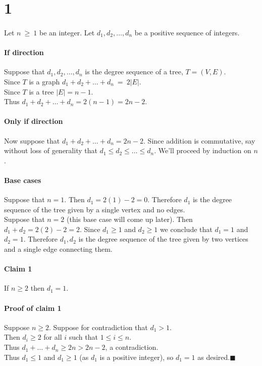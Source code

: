 \documentclass[letterpaper,12pt,oneside,onecolumn]{report}
\begin{document}
\section*{1}
\paragraph{}
Let $n\ \geq\ 1$ be an integer. Let $d_1,d_2,\ldots,d_n$ be a positive sequence of integers.
\paragraph{If direction}
Suppose that $d_1,d_2,\ldots,d_n$ is the degree sequence of a tree, $T = (V,E)$.\\
Since $T$ is a graph $d_1 + d_2 + \ldots + d_n\ =\ 2|E|$.\\
Since $T$ is a tree $|E| = n - 1$.\\
Thus $d_1 + d_2 + \ldots + d_n = 2(n-1) = 2n-2$.
\paragraph{Only if direction}
Now suppose that $d_1 + d_2 + \ldots + d_n = 2n-2$. Since addition is commutative, say without loss of generality that $d_1 \leq d_2 \leq \ldots \leq d_n$.
We'll proceed by induction on $n$.
\paragraph{Base cases}
Suppose that $n=1$. Then $d_1 = 2(1) - 2 = 0$. Therefore $d_1$ is the degree sequence of the tree given by a single vertex and no edges.\\
Suppose that $n=2$ (this base case will come up later). Then $d_1 + d_2 = 2(2) -2 = 2$. Since $d_1 \geq 1$ and $d_2 \geq 1$ we conclude that $d_1 = 1$ and $d_2 = 1$. Therefore $d_1, d_2$ is the degree sequence of the tree given by two vertices and a single edge connecting them.\\
\paragraph{Claim 1}
If $n \geq 2$ then $d_1 = 1$.
\paragraph{Proof of claim 1}
Suppose $n \geq 2$. Suppose for contradiction that $d_1 > 1$.\\
Then $d_i \geq 2$ for all $i$ such that $1 \leq i \leq n$.\\
Thus $d_1 + \ldots + d_n \geq 2n > 2n-2$, a contradiction.\\
Thus $d_1 \leq 1$ and $d_1 \geq 1$ (as $d_1$ is a positive integer), so $d_1 = 1$ as desired.$\blacksquare$
\end{document}
